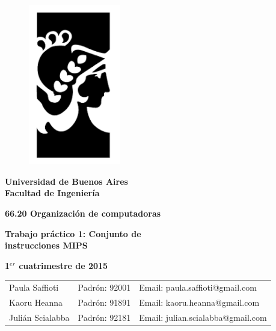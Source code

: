\documentclass[a4paper,11pt]{article}
\title{\textbf{}}
\author{}
\date{}
\begin{document}
\begin{titlepage}
\begin{center}

\vspace*{-1in}
\begin{figure}[htb]
\begin{center}
\includegraphics[width=4cm]{logo.png}
\end{center}
\end{figure}
	
\begin{huge}
\textbf{Universidad de Buenos Aires\\
Facultad de Ingenier\'ia \\}
\vspace*{0.2in}
\end{huge}

\begin{LARGE}
\textbf{66.20 Organizaci\'on de computadoras \\}
\vspace*{1in}
\end{LARGE}

\begin{LARGE}
\textbf{Trabajo pr\'actico 1:
Conjunto de \\instrucciones MIPS \\
}
\end{LARGE}
\begin{LARGE}
\textbf{1$^{er}$ cuatrimestre de 2015} \\
\end{LARGE}

\vspace*{1in}

\begin{Large}
\begin{tabular}{ l l l }
   Paula Saffioti & Padr\'on: 92001 & Email: paula.saffioti@gmail.com \\
   Kaoru Heanna & Padr\'on: 91891 & Email: kaoru.heanna@gmail.com \\
   Juli\'an Scialabba & Padr\'on: 92181 & Email: julian.scialabba@gmail.com \\
 \end{tabular}\\
\end{Large}

\end{center}
\end{titlepage}
\end{document}
